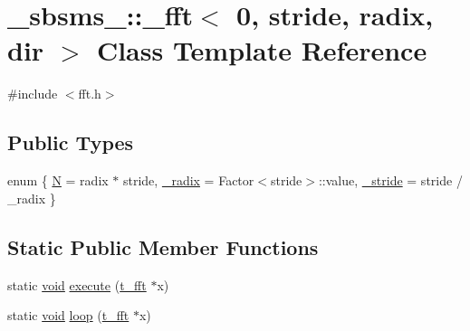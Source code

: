 \hypertarget{class__sbsms___1_1__fft_3_010_00_01stride_00_01radix_00_01dir_01_4}{}\section{\+\_\+sbsms\+\_\+\+:\+:\+\_\+fft$<$ 0, stride, radix, dir $>$ Class Template Reference}
\label{class__sbsms___1_1__fft_3_010_00_01stride_00_01radix_00_01dir_01_4}


{\ttfamily \#include $<$fft.\+h$>$}

\subsection*{Public Types}
\begin{DoxyCompactItemize}
\item 
enum \{ \hyperlink{class__sbsms___1_1__fft_3_010_00_01stride_00_01radix_00_01dir_01_4_ac97edfecd64e85b328dd8464b66475c9ae9297367ceceb379d8597273df9b576f}{N} = radix $\ast$ stride, 
\hyperlink{class__sbsms___1_1__fft_3_010_00_01stride_00_01radix_00_01dir_01_4_ac97edfecd64e85b328dd8464b66475c9afbbbdbe10869c8e57fd8424dcf0d3b28}{\+\_\+radix} = Factor$<$stride$>$\+:\+:value, 
\hyperlink{class__sbsms___1_1__fft_3_010_00_01stride_00_01radix_00_01dir_01_4_ac97edfecd64e85b328dd8464b66475c9a3b883900ab963355ced506159368009b}{\+\_\+stride} = stride / \+\_\+radix
 \}
\end{DoxyCompactItemize}
\subsection*{Static Public Member Functions}
\begin{DoxyCompactItemize}
\item 
static \hyperlink{sound_8c_ae35f5844602719cf66324f4de2a658b3}{void} \hyperlink{class__sbsms___1_1__fft_3_010_00_01stride_00_01radix_00_01dir_01_4_a4722b2e2c3d7106d4ba26d20841a80d6}{execute} (\hyperlink{namespace__sbsms___af5c6f976b2da21c36853e3b0c5995a54}{t\+\_\+fft} $\ast$x)
\item 
static \hyperlink{sound_8c_ae35f5844602719cf66324f4de2a658b3}{void} \hyperlink{class__sbsms___1_1__fft_3_010_00_01stride_00_01radix_00_01dir_01_4_a1787af1f8925939e7cedd27cd8ecb643}{loop} (\hyperlink{namespace__sbsms___af5c6f976b2da21c36853e3b0c5995a54}{t\+\_\+fft} $\ast$x)
\end{DoxyCompactItemize}


